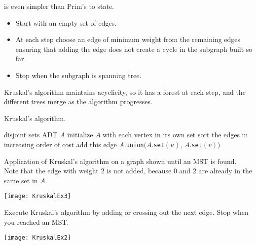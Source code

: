  is even simpler than Prim's to state.
\vspace{-1.5mm}
\begin{itemize}
\item Start with an empty set of edges.
\item At each step choose an edge of minimum weight from the remaining edges ensuring 
that adding the edge does not create a cycle in the subgraph built so far. 
\item Stop when the subgraph is spanning tree.
\end{itemize}
\vspace{-1.5mm}
Kruskal's algorithm maintains acyclicity, so it has a forest
at each step, and the different trees merge as the algorithm progresses.

\begin{algorithm}[H]
  \caption{Kruskal's algorithm.}
  \label{alg:kruskal}
\begin{algorithmic}[1]
	\State disjoint sets ADT $A$
	\State initialize $A$ with each vertex in its own set
	\State sort the edges in increasing order of cost
			\State add this edge
			\State $A$.\texttt{union}$(A$.\texttt{set}$(u)$, $A$.\texttt{set}$(v))$
		\EndIf
	\EndFor
	\State {}
\EndFunction
\end{algorithmic}
\end{algorithm}

\begin{Boxample}
Application of Kruskal's algorithm on a graph shown until an MST is found. 
Note that the edge  with weight $2$ is not added, 
because $0$ and $2$ are already in the same set in $A$.\\
\begin{center}
\texttt{[image: KruskalEx3]}
\end{center}
\end{Boxample}

\begin{Boxample}[0.2]
Execute Kruskal's algorithm by adding or crossing out the next edge. Stop when you reached an MST.\\

\begin{center}
\texttt{[image: KruskalEx2]}
\end{center}
\end{Boxample}

